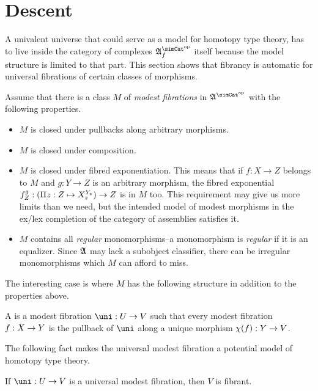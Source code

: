 \documentclass[csh.tex]{subfiles}
\begin{document}
\section{Descent}
A univalent universe that could serve as a model for homotopy type theory, has to live inside the category of complexes $\ambient\s\f$ itself because the model structure is limited to that part. This section shows that fibrancy is automatic for universal fibrations of certain classes of morphisms.

Assume that there is a class $M$ of \emph{modest fibrations} in $\ambient\s$ with the following properties.
\begin{itemize}
\item $M$ is closed under pullbacks along arbitrary morphisms.
\item $M$ is closed under composition.
\item $M$ is closed under fibred exponentiation. This means that if $f:X\to Z$ belongs to $M$ and $g:Y\to Z$ is an arbitrary morphism, the fibred exponential $f^g_Z:(\Pi z: Z \mapsto{X_z^{Y_z}})\to Z$ is in $M$ too. This requirement may give us more limits than we need, but the intended model of modest morphisms in the ex/lex completion of the category of assemblies satisfies it.

\item $M$ contains all \emph{regular} monomorphisms--a monomorphism is \emph{regular} if it is an equalizer. Since $\mathfrak A$ may lack a subobject classifier, there can be irregular monomorphisms which $M$ can afford to miss.
\end{itemize} 

The interesting case is where $M$ has the following structure in addition to the properties above.

\begin{definition} A  is a modest fibration $\uni\of U\to V$ such that every modest fibration $f: X\to Y$ is the pullback of $\uni$ along a unique morphism $\chi(f): Y\to V$.
\end{definition}

The following fact makes the universal modest fibration a potential model of homotopy type theory.

\begin{theorem} If $\uni\of U\to V$ is a universal modest fibration, then $V$ is fibrant. \label{fibrant universe} \end{theorem}
\end{document}
